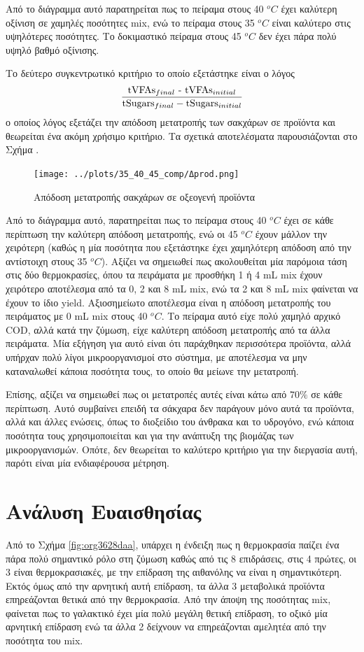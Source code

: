 \documentclass[11pt]{report}
\begin{document}
Από το διάγραμμα αυτό παρατηρείται πως το πείραμα στους 40 \(^oC\) έχει καλύτερη οξίνιση σε χαμηλές ποσότητες \acrshort{mix}, ενώ το πείραμα στους 35 \(^oC\) είναι καλύτερο στις υψηλότερες ποσότητες. Το δοκιμαστικό πείραμα στους 45 \(^oC\) δεν έχει πάρα πολύ υψηλό βαθμό οξίνισης.

Το δεύτερο συγκεντρωτικό κριτήριο το οποίο εξετάστηκε είναι ο λόγος \[ \frac{\text{tVFAs$_{final}$ - \text{tVFAs$_{initial}$}}}{\text{tSugars$_{final}$} -  \text{tSugars$_{initial}$}} \] ο οποίος λόγος εξετάζει την απόδοση μετατροπής των σακχάρων σε προϊόντα και θεωρείται ένα ακόμη χρήσιμο κριτήριο. Τα σχετικά αποτελέσματα παρουσιάζονται στο Σχήμα .

\begin{figure}[htbp]
\centering
\texttt{[image: ../plots/35\_40\_45\_comp/Δprod.png]}
\caption{Απόδοση μετατροπής σακχάρων σε οξεογενή προϊόντα}
\end{figure}

Από το διάγραμμα αυτό, παρατηρείται πως το πείραμα στους 40 \(^oC\) έχει σε κάθε περίπτωση την καλύτερη απόδοση μετατροπής, ενώ οι 45 \(^oC\) έχουν μάλλον την χειρότερη (καθώς η μία ποσότητα που εξετάστηκε έχει χαμηλότερη απόδοση από την αντίστοιχη στους 35 \(^oC\)). Αξίζει να σημειωθεί πως ακολουθείται μία παρόμοια τάση στις δύο θερμοκρασίες, όπου τα πειράματα με προσθήκη 1 ή 4 mL \acrshort{mix} έχουν χειρότερο αποτέλεσμα από τα 0, 2 και 8 mL \acrshort{mix}, ενώ τα 2 και 8 mL \acrshort{mix} φαίνεται να έχουν το ίδιο yield. Αξιοσημείωτο αποτέλεσμα είναι η απόδοση μετατροπής του πειράματος με 0 mL \acrshort{mix} στους 40 \(^oC\). Το πείραμα αυτό είχε πολύ χαμηλό αρχικό COD, αλλά κατά την ζύμωση, είχε καλύτερη απόδοση μετατροπής από τα άλλα πειράματα. Μία εξήγηση για αυτό είναι ότι παράχθηκαν περισσότερα προϊόντα, αλλά υπήρχαν πολύ λίγοι μικροοργανισμοί στο σύστημα, με αποτέλεσμα να μην καταναλωθεί κάποια ποσότητα τους, το οποίο θα μείωνε την μετατροπή.

Επίσης, αξίζει να σημειωθεί πως οι μετατροπές αυτές είναι κάτω από \(70 \%\) σε κάθε περίπτωση. Αυτό συμβαίνει επειδή τα σάκχαρα δεν παράγουν μόνο αυτά τα προϊόντα, αλλά και άλλες ενώσεις, όπως το διοξείδιο του άνθρακα και το υδρογόνο, ενώ κάποια ποσότητα τους χρησιμοποιείται και για την ανάπτυξη της βιομάζας των μικροοργανισμών. Οπότε, δεν θεωρείται το καλύτερο κριτήριο για την διεργασία αυτή, παρότι είναι μία ενδιαφέρουσα μέτρηση.

\section{Ανάλυση Ευαισθησίας}
\label{sec:orgbd7d86e}
Από το Σχήμα \ref{fig:org3628daa}, υπάρχει η ένδειξη πως η θερμοκρασία παίζει ένα πάρα πολύ σημαντικό ρόλο στη ζύμωση καθώς από τις 8 επιδράσεις, στις 4 πρώτες, οι 3 είναι θερμοκρασιακές, με την επίδραση της αιθανόλης να είναι η σημαντικότερη. Εκτός όμως από την αρνητική αυτή επίδραση, τα άλλα 3 μεταβολικά προϊόντα επηρεάζονται θετικά από την θερμοκρασία. Από την άποψη της ποσότητας \acrshort{mix}, φαίνεται πως το γαλακτικό έχει μία πολύ μεγάλη θετική επίδραση, το οξικό μία αρνητική επίδραση ενώ τα άλλα 2 δείχνουν να επηρεάζονται αμελητέα από την ποσότητα του \acrshort{mix}.
\end{document}

